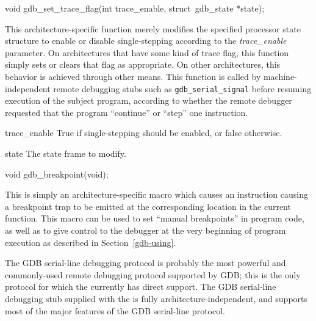 \label{gdb-set-trace-flag}
\begin{apisyn}

	\funcproto void gdb_set_trace_flag(int trace_enable,
					   \inoutparam struct~gdb_state *state);
\end{apisyn}
\begin{apidesc}
	This architecture-specific function
	merely modifies the specified processor state structure
	to enable or disable single-stepping
	according to the \emph{trace_enable} parameter.
	On architectures that have some kind of trace flag,
	this function simply sets or clears that flag as appropriate.
	On other architectures,
	this behavior is achieved through other means.
	This function is called by machine-independent remote debugging stubs
	such as {\tt gdb_serial_signal}
	before resuming execution of the subject program,
	according to whether the remote debugger requested
	that the program ``continue'' or ``step'' one instruction.
\end{apidesc}
\begin{apiparm}
	\item[trace_enable]
		True if single-stepping should be enabled,
		or false otherwise.
	\item[state]
		The state frame to modify.
\end{apiparm}

\label{gdb-breakpoint}
\begin{apisyn}

	\funcproto void gdb_breakpoint(void);
\end{apisyn}
\begin{apidesc}
	This is simply an architecture-specific macro
	which causes an instruction causing a breakpoint trap
	to be emitted at the corresponding location in the current function.
	This macro can be used to set ``manual breakpoints'' in program code,
	as well as to give control to the debugger
	at the very beginning of program execution
	as described in Section~\ref{gdb-using}.
\end{apidesc}

\label{gdb-serial}

The GDB serial-line debugging protocol
is probably the most powerful and commonly-used remote debugging protocol
supported by GDB; this is the only protocol
for which the \oskit{} currently has direct support.
The GDB serial-line debugging stub supplied with the \oskit{}
is fully architecture-independent,
and supports most of the major features of the GDB serial-line protocol.

